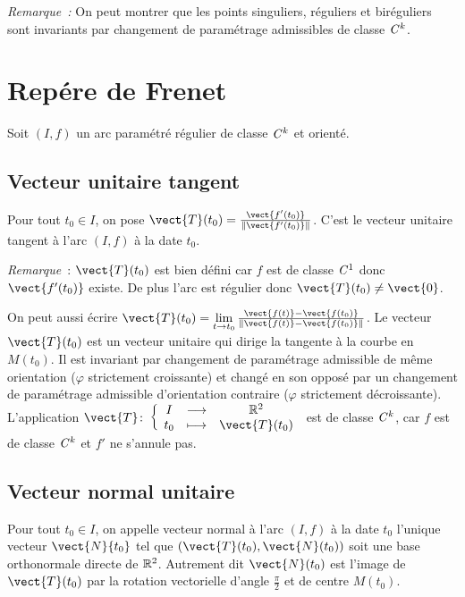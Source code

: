 \emph{Remarque~:} On peut montrer que les points singuliers, réguliers et biréguliers sont invariants par changement de paramétrage admissibles de classe $\mathit{C}^k$.

\section{Repére de Frenet}

Soit $(I, f)$ un arc paramétré régulier de classe $\mathit{C}^k$ et orienté.

\subsection{Vecteur unitaire tangent}

\begin{defdef}
  Pour tout $t_0 \in I$, on pose $\vect{T}(t_0) = \frac{\vect{f'(t_0)}}{\norme{\vect{f'(t_0)}}}$. C'est le vecteur unitaire tangent à l'arc $(I, f)$ à la date $t_0$.
\end{defdef}

\emph{Remarque}~: $\vect{T}(t_0)$ est bien défini car $f$ est de classe $\mathit{C}^1$ donc $\vect{f'(t_0)}$ existe. De plus l'arc est régulier donc $\vect{T}(t_0)\neq \vect{0}$.

On peut aussi écrire $\vect{T}(t_0) = \lim\limits_{t \to t_0} \frac{\vect{f(t)}-\vect{f(t_0)}}{\norme{\vect{f(t)}-\vect{f(t_0)}}}$. Le vecteur $\vect{T}(t_0)$ est un vecteur unitaire qui dirige la tangente à la courbe en $M(t_0)$. Il est invariant par changement de paramétrage admissible de même orientation ($\varphi$ strictement croissante) et changé en son opposé par un changement de paramétrage admissible d'orientation contraire ($\varphi$ strictement décroissante). L'application $\fonction{\vect{T}}{I}{\R^2}{t_0}{\vect{T}(t_0)}$ est de classe $\mathit{C}^k$, car $f$ est de classe $\mathit{C}^k$ et $f'$ ne s'annule pas.

\subsection{Vecteur normal unitaire}

\begin{defdef}
  Pour tout $t_0 \in I$, on appelle vecteur normal à l'arc $(I, f)$ à la date $t_0$ l'unique vecteur $\vect{N}{t_0}$ tel que $(\vect{T}(t_0), \vect{N}(t_0))$ soit une base orthonormale directe de $\mathbb{R}^2$. Autrement dit $\vect{N}(t_0)$ est l'image de $\vect{T}(t_0)$ par la rotation vectorielle d'angle $\frac{\pi}{2}$ et de centre $M(t_0)$.
\end{defdef}


